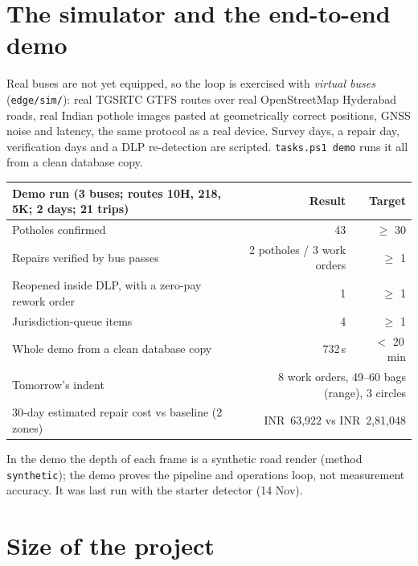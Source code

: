 \documentclass[11pt,a4paper]{article}
\newcommand{\code}[1]{\texttt{\small #1}}
\newcommand{\INR}{INR~}
\begin{document}
\section{The simulator and the end-to-end demo}\label{sec:demo}

Real buses are not yet equipped, so the loop is exercised with \emph{virtual buses} (\code{edge/sim/}): real TGSRTC
GTFS routes over real OpenStreetMap Hyderabad roads, real Indian pothole images pasted at geometrically correct
positions, GNSS noise and latency, the same protocol as a real device. Survey days, a repair day, verification days
and a DLP re-detection are scripted. \code{tasks.ps1 demo} runs it all from a clean database copy.

\begin{center}
\small
\begin{tabularx}{\textwidth}{@{}X r r@{}}
\toprule
\textbf{Demo run} (3 buses; routes 10H, 218, 5K; 2 days; 21 trips) & \textbf{Result} & \textbf{Target}\\
\midrule
Potholes confirmed & 43 & $\ge$ 30\\
Repairs verified by bus passes & 2 potholes / 3 work orders & $\ge$ 1\\
Reopened inside DLP, with a zero-pay rework order & 1 & $\ge$ 1\\
Jurisdiction-queue items & 4 & $\ge$ 1\\
Whole demo from a clean database copy & 732\,s & $<$ 20\,min\\
\midrule
Tomorrow's indent & \multicolumn{2}{r}{8 work orders, 49--60 bags (range), 3 circles}\\
30-day estimated repair cost vs baseline (2 zones) & \multicolumn{2}{r}{\INR63,922 vs \INR2,81,048}\\
\bottomrule
\end{tabularx}
\end{center}
In the demo the depth of each frame is a synthetic road render (method \code{synthetic}); the demo proves the pipeline
and operations loop, not measurement accuracy. It was last run with the starter detector (14 Nov).

\section{Size of the project}\label{sec:size}
\end{document}
